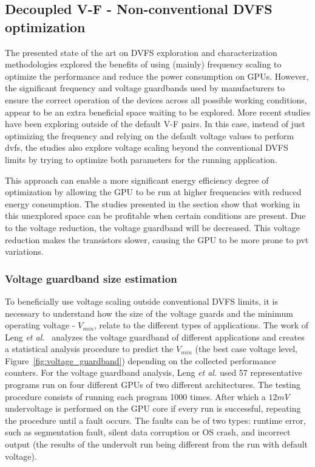 \subsection{Decoupled V-F - Non-conventional DVFS optimization}
\label{section:decoupled}

The presented state of the art on DVFS exploration and characterization methodologies explored the benefits of using (mainly) frequency scaling to optimize the performance and reduce the power consumption on GPUs. However, the significant frequency and voltage guardbands used by manufacturers to ensure the correct operation of the devices across all possible working conditions, appear to be an extra beneficial space waiting to be explored.  More recent studies have been exploring outside of the default V-F pairs. In this case, instead of just optimizing the frequency and relying on the default voltage values to perform \acrshort{dvfs}, the studies also explore voltage scaling beyond the conventional DVFS limits by trying to optimize both parameters for the running application. 

This approach can enable a more significant energy efficiency degree of optimization by allowing the GPU to be run at higher frequencies with reduced energy consumption. 
The studies presented in the section show that working in this unexplored space can be profitable when certain conditions are present. Due to the voltage reduction, the voltage guardband will be decreased. This voltage reduction makes the transistors slower, causing the GPU to be more prone to \acrshort{pvt} variations.

\subsubsection{Voltage guardband size estimation}

To beneficially use voltage scaling outside conventional DVFS limits, it is necessary to understand how the size of the voltage guards and the minimum operating voltage - $V_{min}$, relate to the different types of applications.
The work of Leng \textit{et al.}~\cite{leng_safe_2015} analyzes the voltage guardband of different applications and creates a statistical analysis procedure to predict the $V_{min}$ (the best case voltage level, Figure~\ref{fig:voltage_guardband}) depending on the collected performance counters. For the voltage guardband analysis, Leng \textit{et al.} used 57 representative programs run on four different GPUs of two different architectures. The testing procedure consists of running each program 1000 times. After which a $12mV$ undervoltage is performed on the GPU core if every run is successful, repeating the procedure until a fault occurs. The faults can be of two types: runtime error, such as segmentation fault, silent data corruption or OS crash, and incorrect output (the results of the undervolt run being different from the run with default voltage). 

